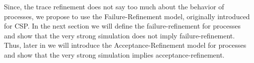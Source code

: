 Since, the trace refinement does not say too much about the behavior of processes, we propose to use the Failure-Refinement model, originally introduced for CSP. In the next section we will define the failure-refinement for \picalc{} processes and show that the very strong simulation does not imply failure-refinement. Thus, later in  we will introduce the Acceptance-Refinement model for \picalc{} processes and show that the very strong simulation implies acceptance-refinement.
